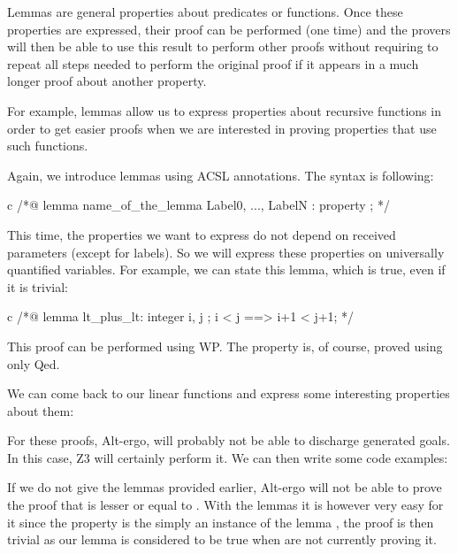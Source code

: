 Lemmas are general properties about predicates or functions. Once these
properties are expressed, their proof can be performed (one time) and
the provers will then be able to use this result to perform other proofs
without requiring to repeat all steps needed to perform the
original proof if it appears in a much longer proof about another
property.




For example, lemmas allow us to express properties about recursive
functions in order to get easier proofs when we are interested in
proving properties that use such functions.





Again, we introduce lemmas using ACSL annotations. The syntax is
following:



\begin{CodeBlock}{c}
/*@
  lemma name_of_the_lemma { Label0, ..., LabelN }:
    property ;
*/
\end{CodeBlock}



This time, the properties we want to express do not depend on received
parameters (except for labels). So we will express these properties on
universally quantified variables. For example, we can state this lemma,
which is true, even if it is trivial:



\begin{CodeBlock}{c}
/*@
  lemma lt_plus_lt:
    \forall integer i, j ; i < j ==> i+1 < j+1;
*/
\end{CodeBlock}



This proof can be performed using WP. The property is, of course, proved
using only Qed.





We can come back to our linear functions and express some interesting
properties about them:






For these proofs, Alt-ergo, will probably not be able to discharge
generated goals. In this case, Z3 will certainly perform it. We can then
write some code examples:






If we do not give the lemmas provided earlier, Alt-ergo will not be able
to prove the proof that  is lesser or equal to
. With the lemmas it is however very easy for it since the
property is the simply an instance of the lemma
, the proof is then trivial as our lemma is
considered to be true when are not currently proving it.

